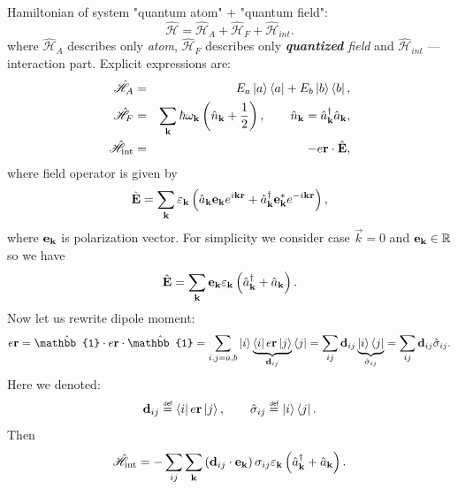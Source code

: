 Hamiltonian of system "quantum atom" $+$ "quantum field":
\begin{equation}
	\hat{\mathscr{H}} = \hat{\mathscr{H}}_A + \hat{\mathscr{H}}_F + \hat{\mathscr{H}}_{int}.
\end{equation}
where $\hat{\mathscr{H}}_A$ describes only \textit{atom}, $\hat{\mathscr{H}}_F$ describes only \textit{\textbf{quantized} field} and $\hat{\mathscr{H}}_{int}$ --- interaction part. Explicit expressions are:
\begin{eqnarray}
	\hat{\mathscr{H}}_A &=& E_a \left\lvert {a} \right\rangle \left\langle {a} \right\rvert + E_b \left\lvert {b} \right\rangle \left\langle {b} \right\rvert, \\
	\hat{\mathscr{H}}_F &=& \sum_{\mathbf{k}} \hbar \omega_{\mathbf{k}} \left( \hat{n}_{\mathbf{k}} + \frac{1}{2} \right), \qquad \hat{n}_{\mathbf{k}} = \hat{a}^{\dagger}_{\mathbf{k}} \hat{a}_{\mathbf{k}}, \\
	\hat{\mathscr{H}}_{\text{int}} &=& -e \mathbf{r} \cdot \hat{\mathbf{E}},
\end{eqnarray}
where field operator is given by
\begin{equation}
	\hat{\mathbf{E}} = \sum_{\mathbf{k}} \varepsilon_{\mathbf{k}} \left( \hat{a}_{\mathbf{k}} \mathbf{e}_{\mathbf{k}} e^{i \mathbf{k} \mathbf{r}} + \hat{a}^{\dagger}_{\mathbf{k}} \mathbf{e}^*_{\mathbf{k}} e^{-i \mathbf{k} \mathbf{r}} \right),
\end{equation}
where $\mathbf{e}_{\mathbf{k}}$ is polarization vector. For simplicity we consider case $\vec{k} = 0$ and $\mathbf{e}_{\mathbf{k}} \in \mathbb{R}$ so we have
\begin{equation}
	\hat{\mathbf{E}} = \sum_{\mathbf{k}} \mathbf{e}_{\mathbf{k}} \varepsilon_{\mathbf{k}} \left( \hat{a}^{\dagger}_{\mathbf{k}} + \hat{a}_{\mathbf{k}} \right).
\end{equation}
Now let us rewrite dipole moment:
\begin{equation}
	e \vec{r} = \hat{\mathbb{1}} \cdot e \vec{r} \cdot \hat{\mathbb{1}} = \sum_{i,j = a,b} \ket{i} \underbrace{\bra{i}  e \vec{r} \ket{j}}_{\vec{d}_{ij}} \bra{j} = \sum_{ij} \vec{d}_{ij} \underbrace{\ket{i} \bra{j}}_{\hat{\sigma}_{ij}} = \sum_{ij} \vec{d}_{ij} \hat{\sigma}_{ij}.
\end{equation}
Here we denoted:
\begin{equation}
	\vec{d}_{ij} \myeq \bra{i}  e \vec{r} \ket{j}, \qquad \hat{\sigma}_{ij} \myeq  \ket{i} \bra{j}.
\end{equation}
Then
\begin{equation}
	\hat{\mathscr{H}}_{\text{int}} = - \sum_{ij} \sum_{\mathbf{k}} \left(\mathbf{d}_{ij} \cdot \mathbf{e}_{\mathbf{k}}\right) \sigma_{ij} \varepsilon_{\mathbf{k}} \left( \hat{a}^{\dagger}_{\mathbf{k}} + \hat{a}_{\mathbf{k}} \right).
\end{equation}

